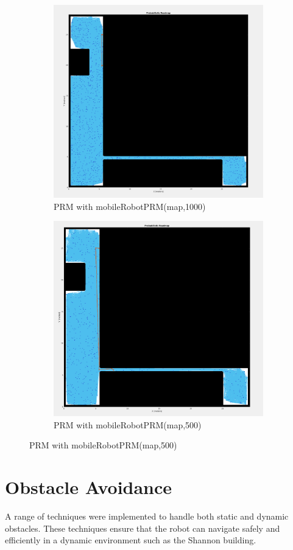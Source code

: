 \documentclass{article}
\begin{document}
		\begin{figure}[!h]
		\centering
		\begin{subfigure}[b]{0.45\textwidth}
			\centering
			\includegraphics[width=.8\textwidth]{fig/fig10.png}
			\caption{PRM with mobileRobotPRM(map,1000)}
			\label{fig:fig10}
		\end{subfigure}
		\hfill
		\begin{subfigure}[b]{0.45\textwidth}
			\centering
			\includegraphics[width=.8\textwidth]{fig/fig11.png}
			\caption{PRM with mobileRobotPRM(map,500)}
			\label{fig:fig11}
		\end{subfigure}
	\end{figure}
	
	\section{Obstacle Avoidance}
	A range of techniques were implemented to handle both static and dynamic obstacles. These techniques ensure that the robot can navigate safely and efficiently in a dynamic environment such as the Shannon building.
	
\end{document}
